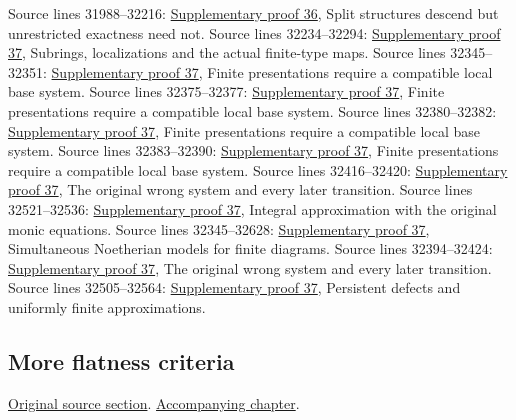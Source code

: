 \begin{AlgebraSourceRoutes}
 Source lines 31988--32216: \hyperlink{algebra_colimit_categories_notes_20260928}{Supplementary proof 36}, Split structures descend but unrestricted exactness need not.
 Source lines 32234--32294: \hyperlink{algebra_noetherian_approximation_notes_20260928}{Supplementary proof 37}, Subrings, localizations and the actual finite-type maps.
 Source lines 32345--32351: \hyperlink{algebra_noetherian_approximation_notes_20260928}{Supplementary proof 37}, Finite presentations require a compatible local base system.
 Source lines 32375--32377: \hyperlink{algebra_noetherian_approximation_notes_20260928}{Supplementary proof 37}, Finite presentations require a compatible local base system.
 Source lines 32380--32382: \hyperlink{algebra_noetherian_approximation_notes_20260928}{Supplementary proof 37}, Finite presentations require a compatible local base system.
 Source lines 32383--32390: \hyperlink{algebra_noetherian_approximation_notes_20260928}{Supplementary proof 37}, Finite presentations require a compatible local base system.
 Source lines 32416--32420: \hyperlink{algebra_noetherian_approximation_notes_20260928}{Supplementary proof 37}, The original wrong system and every later transition.
 Source lines 32521--32536: \hyperlink{algebra_noetherian_approximation_notes_20260928}{Supplementary proof 37}, Integral approximation with the original monic equations.
 Source lines 32345--32628: \hyperlink{algebra_noetherian_approximation_notes_20260928}{Supplementary proof 37}, Simultaneous Noetherian models for finite diagrams.
 Source lines 32394--32424: \hyperlink{algebra_noetherian_approximation_notes_20260928}{Supplementary proof 37}, The original wrong system and every later transition.
 Source lines 32505--32564: \hyperlink{algebra_noetherian_approximation_notes_20260928}{Supplementary proof 37}, Persistent defects and uniformly finite approximations.
\end{AlgebraSourceRoutes}

\subsection{More flatness criteria}
\hypertarget{algebra-source-section-more-flatness-criteria}{}
\noindent\href{https://github.com/stacks/stacks-project/blob/a04446e57ec1fbc252a871afcec7752fb2807b14/algebra.tex\#L32643}{Original source section}. \href{algebra.pdf\#nameddest=section-more-flatness-criteria}{Accompanying chapter}.

